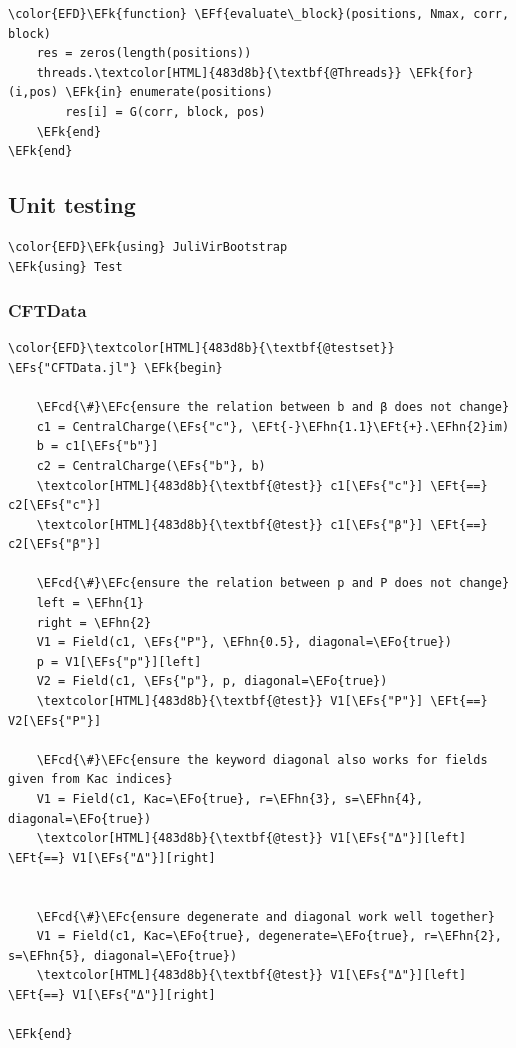 \documentclass[a4paper]{article}
\numberwithin{equation}{section}
\newcommand{\EFc}[1]{\textcolor{EFc}{#1}} %
\newcommand{\EFcd}[1]{\textcolor{EFcd}{#1}} %
\newcommand{\EFs}[1]{\textcolor{EFs}{#1}} %
\newcommand{\EFk}[1]{\textcolor{EFk}{#1}} %
\newcommand{\EFf}[1]{\textcolor{EFf}{#1}} %
\newcommand{\EFt}[1]{\textcolor{EFt}{#1}} %
\newcommand{\EFo}[1]{\textcolor{EFo}{#1}} %
\newcommand{\EFhn}[1]{\textcolor{EFhn}{#1}} %
\begin{document}
\begin{Code}
\begin{Verbatim}
\color{EFD}\EFk{function} \EFf{evaluate\_block}(positions, Nmax, corr, block)
    res = zeros(length(positions))
    threads.\textcolor[HTML]{483d8b}{\textbf{@Threads}} \EFk{for} (i,pos) \EFk{in} enumerate(positions)
        res[i] = G(corr, block, pos)
    \EFk{end}
\EFk{end}
\end{Verbatim}
\end{Code}
\subsection{Unit testing}
\label{sec:org0231e24}
\begin{Code}
\begin{Verbatim}
\color{EFD}\EFk{using} JuliVirBootstrap
\EFk{using} Test
\end{Verbatim}
\end{Code}
\subsubsection*{CFTData}
\label{sec:org32d0aac}

\begin{Code}
\begin{Verbatim}
\color{EFD}\textcolor[HTML]{483d8b}{\textbf{@testset}} \EFs{"CFTData.jl"} \EFk{begin}

    \EFcd{\#}\EFc{ensure the relation between b and β does not change}
    c1 = CentralCharge(\EFs{"c"}, \EFt{-}\EFhn{1.1}\EFt{+}.\EFhn{2}im)
    b = c1[\EFs{"b"}]
    c2 = CentralCharge(\EFs{"b"}, b)
    \textcolor[HTML]{483d8b}{\textbf{@test}} c1[\EFs{"c"}] \EFt{==} c2[\EFs{"c"}]
    \textcolor[HTML]{483d8b}{\textbf{@test}} c1[\EFs{"β"}] \EFt{==} c2[\EFs{"β"}]

    \EFcd{\#}\EFc{ensure the relation between p and P does not change}
    left = \EFhn{1}
    right = \EFhn{2}
    V1 = Field(c1, \EFs{"P"}, \EFhn{0.5}, diagonal=\EFo{true})
    p = V1[\EFs{"p"}][left]
    V2 = Field(c1, \EFs{"p"}, p, diagonal=\EFo{true})
    \textcolor[HTML]{483d8b}{\textbf{@test}} V1[\EFs{"P"}] \EFt{==} V2[\EFs{"P"}]

    \EFcd{\#}\EFc{ensure the keyword diagonal also works for fields given from Kac indices}
    V1 = Field(c1, Kac=\EFo{true}, r=\EFhn{3}, s=\EFhn{4}, diagonal=\EFo{true})
    \textcolor[HTML]{483d8b}{\textbf{@test}} V1[\EFs{"Δ"}][left] \EFt{==} V1[\EFs{"Δ"}][right]


    \EFcd{\#}\EFc{ensure degenerate and diagonal work well together}
    V1 = Field(c1, Kac=\EFo{true}, degenerate=\EFo{true}, r=\EFhn{2}, s=\EFhn{5}, diagonal=\EFo{true})
    \textcolor[HTML]{483d8b}{\textbf{@test}} V1[\EFs{"Δ"}][left] \EFt{==} V1[\EFs{"Δ"}][right]

\EFk{end}
\end{Verbatim}
\end{Code}
\end{document}
